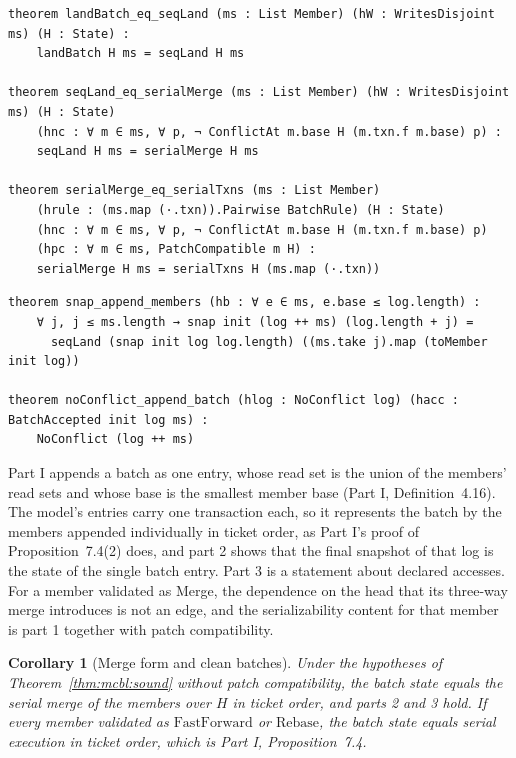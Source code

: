 \documentclass[11pt,letterpaper]{article}
\newtheorem{corollary}[theorem]{Corollary}
\theoremstyle{definition}
\theoremstyle{remark}
\newcommand{\FF}{\mathrm{FastForward}}
\newcommand{\Rb}{\mathrm{Rebase}}
\begin{document}
\begin{lstlisting}[language=Lean,caption={The three steps of the headline proof (\texttt{YonedaTx/Batch.lean})},label={lst:mcbl:batchlemmas}]
theorem landBatch_eq_seqLand (ms : List Member) (hW : WritesDisjoint ms) (H : State) :
    landBatch H ms = seqLand H ms

theorem seqLand_eq_serialMerge (ms : List Member) (hW : WritesDisjoint ms) (H : State)
    (hnc : ∀ m ∈ ms, ∀ p, ¬ ConflictAt m.base H (m.txn.f m.base) p) :
    seqLand H ms = serialMerge H ms

theorem serialMerge_eq_serialTxns (ms : List Member)
    (hrule : (ms.map (·.txn)).Pairwise BatchRule) (H : State)
    (hnc : ∀ m ∈ ms, ∀ p, ¬ ConflictAt m.base H (m.txn.f m.base) p)
    (hpc : ∀ m ∈ ms, PatchCompatible m H) :
    serialMerge H ms = serialTxns H (ms.map (·.txn))
\end{lstlisting}

\begin{lstlisting}[language=Lean,caption={The batch as a log (\texttt{YonedaTx/Soundness.lean})},label={lst:mcbl:noconf}]
theorem snap_append_members (hb : ∀ e ∈ ms, e.base ≤ log.length) :
    ∀ j, j ≤ ms.length → snap init (log ++ ms) (log.length + j) =
      seqLand (snap init log log.length) ((ms.take j).map (toMember init log))

theorem noConflict_append_batch (hlog : NoConflict log) (hacc : BatchAccepted init log ms) :
    NoConflict (log ++ ms)
\end{lstlisting}

Part I appends a batch as one entry, whose read set is the union of the members' read sets and whose base is the smallest member base (Part I, Definition~4.16). The model's entries carry one transaction each, so it represents the batch by the members appended individually in ticket order, as Part I's proof of Proposition~7.4(2) does, and part 2 shows that the final snapshot of that log is the state of the single batch entry. Part 3 is a statement about declared accesses. For a member validated as Merge, the dependence on the head that its three-way merge introduces is not an edge, and the serializability content for that member is part 1 together with patch compatibility.

\begin{corollary}[Merge form and clean batches]
\label{cor:mcbl:merged}
Under the hypotheses of Theorem~\ref{thm:mcbl:sound} without patch compatibility, the batch state equals the serial merge of the members over $H$ in ticket order, and parts 2 and 3 hold. If every member validated as $\FF$ or $\Rb$, the batch state equals serial execution in ticket order, which is Part I, Proposition~7.4.
\end{corollary}
\end{document}
